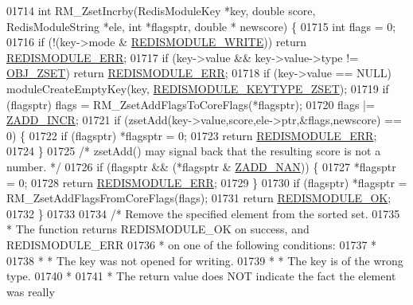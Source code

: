 \begin{DoxyCode}
{{{01714 \textcolor{keywordtype}{int} RM\_ZsetIncrby(RedisModuleKey *key, \textcolor{keywordtype}{double} score, RedisModuleString *ele, \textcolor{keywordtype}{int} *flagsptr, \textcolor{keywordtype}{double} *
      newscore) \{
01715     \textcolor{keywordtype}{int} flags = 0;
01716     \textcolor{keywordflow}{if} (!(key->mode & \hyperlink{redismodule_8h_a73b37117ef94cb4a904361afcc51b6b4}{REDISMODULE\_WRITE})) \textcolor{keywordflow}{return} 
      \hyperlink{redismodule_8h_a3df6f5bd5247289e66f44437a7cddd49}{REDISMODULE\_ERR};
01717     \textcolor{keywordflow}{if} (key->value && key->value->type != \hyperlink{server_8h_a8c356422ddbc03bd77694880a30a1953}{OBJ\_ZSET}) \textcolor{keywordflow}{return} 
      \hyperlink{redismodule_8h_a3df6f5bd5247289e66f44437a7cddd49}{REDISMODULE\_ERR};
01718     \textcolor{keywordflow}{if} (key->value == NULL) moduleCreateEmptyKey(key,
      \hyperlink{redismodule_8h_a93d1514d4c11cc65551b36cfd9a72cc2}{REDISMODULE\_KEYTYPE\_ZSET});
01719     \textcolor{keywordflow}{if} (flagsptr) flags = RM\_ZsetAddFlagsToCoreFlags(*flagsptr);
01720     flags |= \hyperlink{server_8h_aa31f5564c57b55123a4e2d6a5eb599cf}{ZADD\_INCR};
01721     \textcolor{keywordflow}{if} (zsetAdd(key->value,score,ele->ptr,&flags,newscore) == 0) \{
01722         \textcolor{keywordflow}{if} (flagsptr) *flagsptr = 0;
01723         \textcolor{keywordflow}{return} \hyperlink{redismodule_8h_a3df6f5bd5247289e66f44437a7cddd49}{REDISMODULE\_ERR};
01724     \}
01725     \textcolor{comment}{/* zsetAdd() may signal back that the resulting score is not a number. */}
01726     \textcolor{keywordflow}{if} (flagsptr && (*flagsptr & \hyperlink{server_8h_ae46720414ddb69ab95bbade04b15194c}{ZADD\_NAN})) \{
01727         *flagsptr = 0;
01728         \textcolor{keywordflow}{return} \hyperlink{redismodule_8h_a3df6f5bd5247289e66f44437a7cddd49}{REDISMODULE\_ERR};
01729     \}
01730     \textcolor{keywordflow}{if} (flagsptr) *flagsptr = RM\_ZsetAddFlagsFromCoreFlags(flags);
01731     \textcolor{keywordflow}{return} \hyperlink{redismodule_8h_a1bc5bfd69abcd378ff52c640adc5418d}{REDISMODULE\_OK};
01732 \}
01733 
01734 \textcolor{comment}{/* Remove the specified element from the sorted set.}
01735 \textcolor{comment}{ * The function returns REDISMODULE\_OK on success, and REDISMODULE\_ERR}
01736 \textcolor{comment}{ * on one of the following conditions:}
01737 \textcolor{comment}{ *}
01738 \textcolor{comment}{ * * The key was not opened for writing.}
01739 \textcolor{comment}{ * * The key is of the wrong type.}
01740 \textcolor{comment}{ *}
01741 \textcolor{comment}{ * The return value does NOT indicate the fact the element was really}
}}}
\end{DoxyCode}
